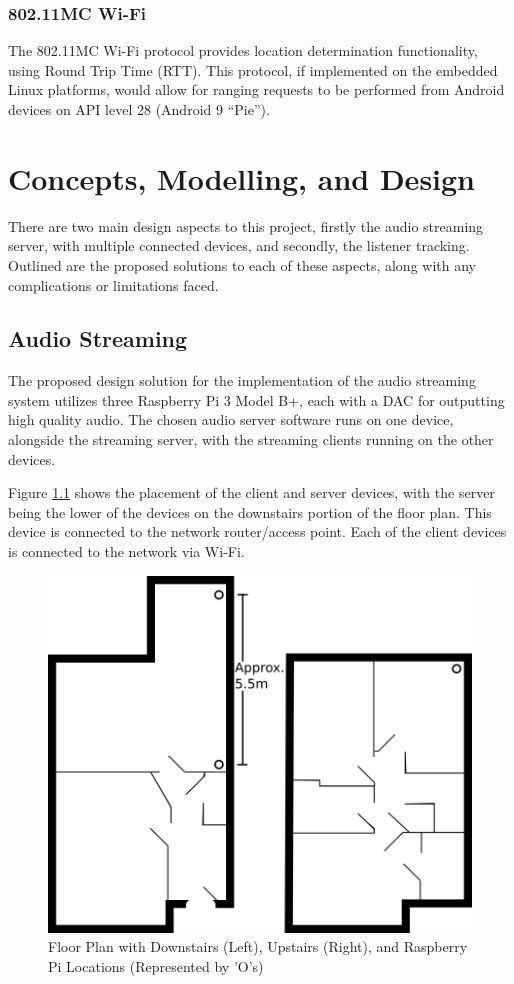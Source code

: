 \documentclass[11pt,a4paper,headinclude=false,footinclude=false]{scrreprt}
\begin{document}
\subsection{802.11MC Wi-Fi}\label{mc-wi-fi}

The 802.11MC Wi-Fi protocol provides location determination
functionality, using Round Trip Time (RTT). This protocol, if
implemented on the embedded Linux platforms, would allow for ranging
requests to be performed from Android devices on API level 28 (Android 9
``Pie'')\cite{droidRTT}.

\chapter{Concepts, Modelling, and
Design}\label{concepts-modelling-and-design}

There are two main design aspects to this project, firstly the audio
streaming server, with multiple connected devices, and secondly, the
listener tracking. Outlined are the proposed solutions to each of these
aspects, along with any complications or limitations faced.

\section{Audio Streaming}\label{audio-streaming}

The proposed design solution for the implementation of the audio
streaming system utilizes three Raspberry Pi 3 Model B+, each with a DAC
for outputting high quality audio. The chosen audio server software runs
on one device, alongside the streaming server, with the streaming
clients running on the other devices.

Figure \ref{floorplan} shows the placement of the client and server
devices, with the server being the lower of the devices on the
downstairs portion of the floor plan. This device is connected to the
network router/access point. Each of the client devices is connected to
the network via Wi-Fi.

\begin{figure}[H]
\includegraphics{ConceptsModellingDesign/floorplan.png}
\centering
\caption{Floor Plan with Downstairs (Left), Upstairs (Right), and Raspberry Pi
Locations (Represented by 'O's)}
\label{floorplan}
\end{figure}
\end{document}
